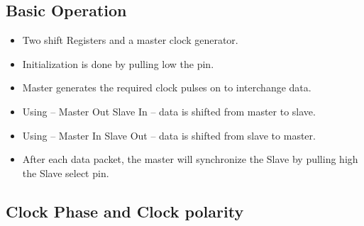 \subsection{Basic Operation}
\begin{itemize}
    \item Two shift Registers and a master clock generator.
    \item Initialization is done by pulling low the  pin.
    \item Master generates the required clock pulses on  to interchange data.
    \item Using  – Master Out Slave In – data is shifted from master to slave.
    \item Using  – Master In Slave Out – data is shifted from slave to master.
    \item After each data packet, the master will synchronize the Slave by pulling high the Slave select   pin.
\end{itemize}




\subsection{Clock Phase and Clock polarity}


